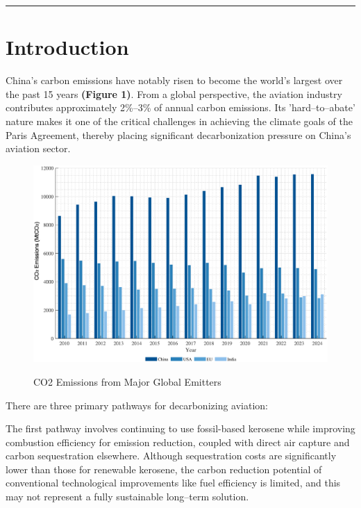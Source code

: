 \documentclass[a4paper,11pt]{article}
\begin{document}
\vspace{1em}
\hrule
\vspace{1.5em}


\newpage
\section{Introduction}
China's carbon emissions have notably risen to become the world's largest over the past 15 years \textbf{(Figure 1)}. From a global perspective, the aviation industry contributes approximately 2\%--3\% of annual carbon emissions. Its 'hard--to--abate' nature makes it one of the critical challenges in achieving the climate goals of the Paris Agreement, thereby placing significant decarbonization pressure on China's aviation sector.


\begin{figure}[htbp]
    \centering
    \caption{ {\color{schoolblue}CO2 Emissions from Major Global Emitters}}
    \includegraphics[width=0.9\linewidth]{global_co2_emissions.eps}
    \label{fig:co2_emissions}
\end{figure}


There are three primary pathways for decarbonizing aviation:

The first pathway involves continuing to use fossil-based kerosene while improving combustion efficiency for emission reduction, coupled with direct air capture and carbon sequestration elsewhere. Although sequestration costs are significantly lower than those for renewable kerosene, the carbon reduction potential of conventional technological improvements like fuel efficiency is limited, and this may not represent a fully sustainable long--term solution.
\end{document}
